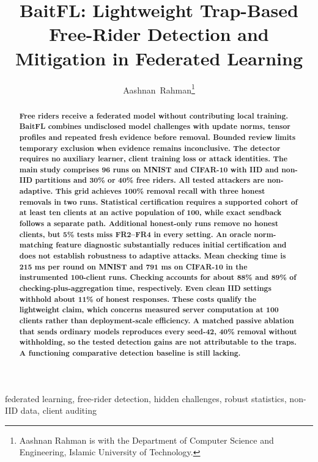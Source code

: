 \documentclass[journal]{IEEEtran}
\title{BaitFL: Lightweight Trap-Based Free-Rider Detection and Mitigation in Federated Learning}
\author{Aashnan~Rahman\thanks{Aashnan Rahman is with the Department of Computer Science and Engineering, Islamic University of Technology.}}
\begin{document}
\maketitle
\raggedbottom
\setlength{\parskip}{0pt plus 2pt minus 0.5pt}
\makeatletter
\def\@textbottom{\vskip\z@ plus 6pt}
\makeatother
\setlength{\abovedisplayskip}{6pt plus 1pt minus 1pt}
\setlength{\belowdisplayskip}{6pt plus 1pt minus 1pt}
\setlength{\abovedisplayshortskip}{3pt plus 1pt minus 1pt}
\setlength{\belowdisplayshortskip}{3pt plus 1pt minus 1pt}

\begin{abstract}
\bfseries
Free riders receive a federated model without contributing local training.
BaitFL combines undisclosed model challenges with update norms, tensor
profiles and repeated fresh evidence before removal. Bounded review limits
temporary exclusion when evidence remains inconclusive. The detector
requires no auxiliary learner, client training loss or attack identities.
The main study comprises 96 runs on MNIST and CIFAR-10 with IID and
non-IID partitions and 30\% or 40\% free riders. All tested attackers are
non-adaptive. This grid achieves 100\% removal recall with three honest
removals in two runs. Statistical certification requires a supported cohort
of at least ten clients at an active population of 100, while exact
sendback follows a separate path. Additional honest-only runs remove no
honest clients, but 5\% tests miss FR2--FR4 in every setting. An oracle
norm-matching feature diagnostic substantially reduces initial
certification and does not establish robustness to adaptive attacks.
Mean checking time is 215 ms per round on MNIST and 791 ms on CIFAR-10
in the instrumented 100-client runs. Checking accounts for about 88\%
and 89\% of checking-plus-aggregation time, respectively.
Even clean IID settings withhold about 11\% of honest responses.
These costs qualify the lightweight claim, which concerns measured
server computation at 100 clients rather than deployment-scale efficiency.
A matched passive ablation that sends ordinary models reproduces every
seed-42, 40\% removal without withholding, so the tested detection gains
are not attributable to the traps. A functioning comparative detection
baseline is still lacking.
\end{abstract}

\begin{IEEEkeywords}
federated learning, free-rider detection, hidden challenges, robust statistics,
non-IID data, client auditing
\end{IEEEkeywords}
\end{document}
